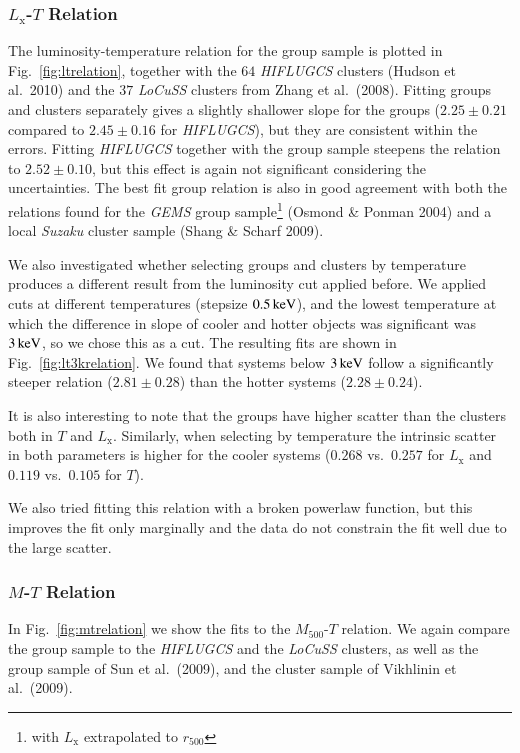 \documentclass[structabstract]{aa}
\begin{document}
\subsubsection{$L_{\text{x}}$-$T$ Relation}
The luminosity-temperature relation for the group sample is plotted in
Fig.\ \ref{fig:ltrelation}, together with the $64$ \emph{HIFLUGCS}
clusters (Hudson et al.\ 2010) and the $37$ \emph{LoCuSS} clusters
from Zhang et al.\ (2008). Fitting groups and clusters separately
gives a slightly shallower slope for the groups ($2.25 \pm 0.21$
compared to $2.45 \pm 0.16$ for \emph{HIFLUGCS}), but they are
consistent within the errors. Fitting \emph{HIFLUGCS} together with
the group sample steepens the relation to $2.52 \pm 0.10$, but this
effect is again not significant considering the uncertainties. The
best fit group relation is also in good agreement with both the
relations found for the \emph{GEMS} group sample\footnote{with
  $L_{\text{x}}$ extrapolated to $r_{500}$} (Osmond \& Ponman 2004)
and a local \emph{Suzaku} cluster sample (Shang \& Scharf 2009).

We also investigated whether selecting groups and clusters by
temperature produces a different result from the luminosity cut
applied before. We applied cuts at different temperatures
  (stepsize $\unit[0.5]{keV}$), and the lowest temperature at which the
  difference in slope of cooler and hotter objects was significant was
  $\unit[3]{keV}$, so we chose this as a cut. The resulting fits are shown in Fig.\
\ref{fig:lt3krelation}. We found that systems below $\unit[3]{keV}$
follow a significantly steeper relation ($2.81 \pm 0.28$) than the
hotter systems ($2.28 \pm 0.24$).

It is also interesting to note that the groups have higher scatter
than the clusters both in $T$ and $L_{\text{x}}$. Similarly, when
selecting by temperature the intrinsic scatter in both
parameters is higher for the cooler systems ($0.268$ vs.\ $0.257$
  for $L_{\text{x}}$ and $0.119$ vs.\ $0.105$ for $T$). 

  We also tried fitting this relation with a broken powerlaw function,
  but this improves the fit only marginally and the data do not
  constrain the fit well due to the large scatter.
%
 \subsubsection{$M$-$T$ Relation}
 In Fig.\ \ref{fig:mtrelation} we show the fits to the $M_{500}$-$T$
 relation. We again compare the group sample to the \emph{HIFLUGCS}
 and the \emph{LoCuSS} clusters, as well as the group sample of Sun et
 al.\ (2009), and the cluster sample of Vikhlinin et al.\ (2009).
\end{document}
